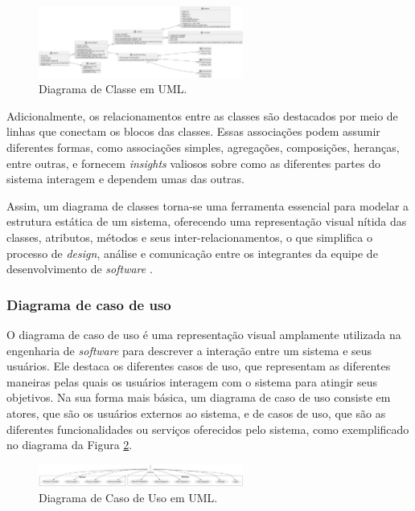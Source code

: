 \begin{figure}[htb]
    \caption{\label{fig:ClassDiagram}Diagrama de Classe em UML.}
    \begin{center}
        \includegraphics[width=0.6\textwidth]{figuras/ClassDiagram.png}
    \end{center}
\end{figure}
            
Adicionalmente, os relacionamentos entre as classes são destacados por meio de linhas que conectam os blocos das classes. Essas associações podem assumir diferentes formas, como associações simples, agregações, composições, heranças, entre outras, e fornecem \textit{insights} valiosos sobre como as diferentes partes do sistema interagem e dependem umas das outras.
            
Assim, um diagrama de classes torna-se uma ferramenta essencial para modelar a estrutura estática de um sistema, oferecendo uma representação visual nítida das classes, atributos, métodos e seus inter-relacionamentos, o que simplifica o processo de \textit{design}, análise e comunicação entre os integrantes da equipe de desenvolvimento de \textit{software} \cite{softwareenguml}.
            
\subsubsection{Diagrama de caso de uso}
        
O diagrama de caso de uso é uma representação visual amplamente utilizada na engenharia de \textit{software} para descrever a interação entre um sistema e seus usuários. Ele destaca os diferentes casos de uso, que representam as diferentes maneiras pelas quais os usuários interagem com o sistema para atingir seus objetivos. Na sua forma mais básica, um diagrama de caso de uso consiste em atores, que são os usuários externos ao sistema, e de casos de uso, que são as diferentes funcionalidades ou serviços oferecidos pelo sistema, como exemplificado no diagrama da Figura \ref{fig:UseCaseDiagram}.
        
\begin{figure}[htb]
    \caption{\label{fig:UseCaseDiagram}Diagrama de Caso de Uso em UML.}
    \begin{center}
        \includegraphics[width=0.6\textwidth]{figuras/UseCaseDiagram.png}
    \end{center}
\end{figure}
        
